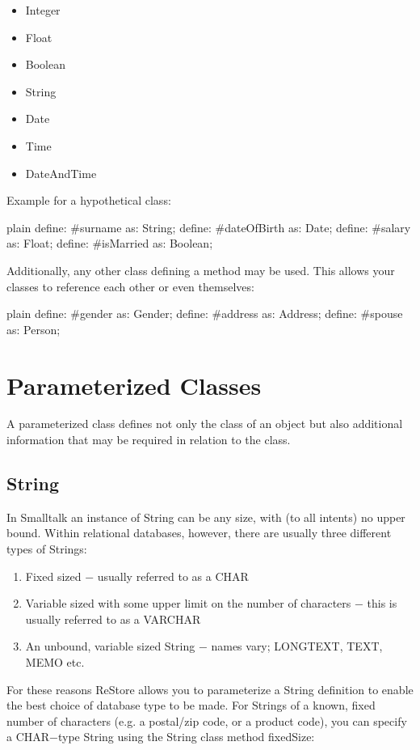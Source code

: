 \documentclass[10pt,twoside,english]{_support/latex/sbabook/sbabook}
\begin{document}
\begin{itemize}
\item Integer
\item Float
\item Boolean
\item String
\item Date 
\item Time
\item DateAndTime 
\end{itemize}

Example for a hypothetical  class: 

\begin{displaycode}{plain}
	define: #surname as: String;
	define: #dateOfBirth as: Date;
	define: #salary as: Float;
	define: #isMarried as: Boolean; 
\end{displaycode}

Additionally, any other class defining a  method may be used. This allows your classes to reference each other or even themselves:

\begin{displaycode}{plain}
	define: #gender as: Gender;
	define: #address as: Address;
	define: #spouse as: Person; 
\end{displaycode}
\section{Parameterized Classes}
A parameterized class defines not only the class of an object but also additional information that may be required in relation to the class. 
\subsection{String}
In Smalltalk an instance of String can be any size, with (to all intents) no upper bound. Within relational databases, however, there are usually three different types of Strings: 

\begin{enumerate}
\item Fixed sized − usually referred to as a CHAR 
\item Variable sized with some upper limit on the number of characters − this is usually referred to as a VARCHAR 
\item An unbound, variable sized String − names vary; LONGTEXT, TEXT, MEMO etc. 
\end{enumerate}

For these reasons ReStore allows you to parameterize a String definition to enable the best choice of database type to be made. For Strings of a known, fixed number of characters (e.g. a postal/zip code, or a product code), you can specify a CHAR−type String using the String class method fixedSize: 
\end{document}
